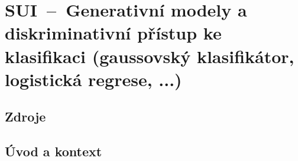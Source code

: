 

\graphicspath{{sui/klasifikace_generativni_diskriminativni/figures}}


\chapter{SUI~--~Generativní modely a diskriminativní přístup ke klasifikaci (gaussovský klasifikátor, logistická regrese, ...)}


\section{Zdroje}

\begin{compactitem}
    \item {}
\end{compactitem}


\section{Úvod a kontext}


